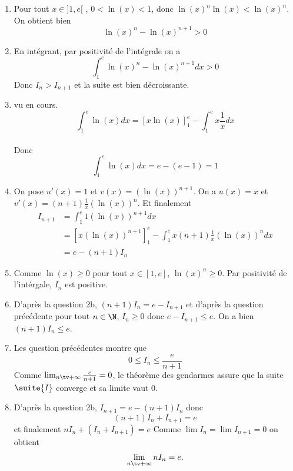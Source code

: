 \begin{correction}
\begin{enumerate}
\item Pour tout $x\in ]1,e[ $ , $0<\ln(x) <1$, donc $\ln(x)^n \ln(x)< \ln(x)^n $. On obtient bien 
$$\ln(x)^n -\ln(x)^{n+1}>0$$
\item En intégrant, par positivité de l'intégrale on a 
$$\int_1^e \ln(x)^n -\ln(x)^{n+1}dx >0$$
Donc $I_n>I_{n+1}$ et la suite est bien décroissante. 

\item vu en cours. 
$$\int_1^e \ln(x) dx= [x\ln(x)]_1^e - \int_1^e x \frac{1}{x}dx$$\\
Donc $$\int_1^e \ln(x) dx = e-(e-1) =1$$

\item On pose $u'(x)= 1$ et $v(x) = (\ln(x))^{n+1}$. On  a
$u(x)=x$ et $v'(x) = (n+1) \frac{1}{x}  (\ln(x))^{n}$. Et finalement 
\begin{align*}
I_{n+1} &=  \int_1^e 1 (\ln(x))^{n+1} dx\\
			 &= [x (\ln(x))^{n+1}]^e_1 -\int_1^e  x  (n+1) \frac{1}{x}  (\ln(x))^{n} dx  \\
			  &= e -(n+1)I_n 
\end{align*}

\item Comme $\ln(x)\geq 0$ pour tout $x\in [1,e]$, $\ln(x)^n\geq 0$. Par positivité de l'intérgale, $I_n$ est positive. 
\item D'après la question 2b, $(n+1)I_n = e -I_{n+1}$ et d'après la question précédente pour tout $n\in\N$, $I_n \geq 0$ donc 
$e-I_{n+1} \leq e$. On  a bien $(n+1)I_n\leq e$. 
\item Les question précédentes montre que 
$$0\leq I_n \leq \frac{e}{n+1}$$
Comme $\lim_{n\tv+\infty} \frac{e}{n+1}=0$, le théorème des gendarmes assure que la suite $\suite{I}$ converge et sa limite vaut $0$. 

\item D'après la question 2b, $I_{n+1} = e- (n+1)I_n$ donc 
$$(n+1)I_n+I_{n+1} =e$$
et finalement 
$nI_n + (I_n +I_{n+1}) =e$
Comme $\lim I_n = \lim I_{n+1} =0$ on obtient 
$$\lim_{n\tv+\infty}  nI_n = e.$$

\end{enumerate}
\end{correction}





